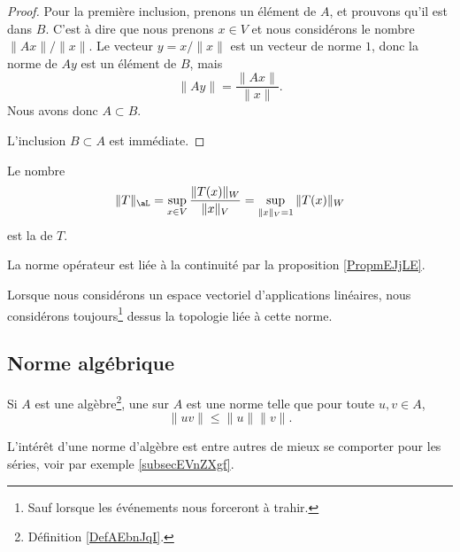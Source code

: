 \begin{proof}
    Pour la première inclusion, prenons un élément de \( A\), et prouvons qu'il est dans \( B\). C'est à dire que nous prenons \( x\in V\) et nous considérons le nombre \( \| Ax \|/\| x \|\). Le vecteur \( y=x/\| x \|\) est un vecteur de norme $1$, donc la norme de \( Ay\) est un élément de \( B\), mais
    \begin{equation}
        \| Ay \|=\frac{ \| Ax \| }{ \| x \| }.
    \end{equation}
    Nous avons donc \( A\subset B\).

    L'inclusion \( B\subset A\) est immédiate.
\end{proof}

\begin{definition}          \label{DefNFYUooBZCPTr}
    Le nombre 
    \begin{equation}
        \| T \|_{\aL}=\sup_{x\in V}\frac{\|T(x)\|_{W}}{\|x\|_{V}} =\sup_{\|x\|_{V}=1}\|T(x)\|_{W}
    \end{equation}
    est la  de $T$. 
\end{definition}

La norme opérateur est liée à la continuité par la proposition \ref{PropmEJjLE}.

Lorsque nous considérons un espace vectoriel d'applications linéaires, nous considérons toujours\footnote{Sauf lorsque les événements nous forceront à trahir.} dessus la topologie liée à cette norme. 

\subsection{Norme algébrique}

\begin{definition}  \label{DefJWRWQue}
    Si \( A\) est une algèbre\footnote{Définition \ref{DefAEbnJqI}.}, une  sur \( A\) est une norme telle que pour toute \( u,v\in A\),
    \begin{equation}
        \| uv \|\leq \| u \|\| v \|.
    \end{equation}
\end{definition}
L'intérêt d'une norme d'algèbre est entre autres de mieux se comporter pour les séries, voir par exemple \ref{subsecEVnZXgf}.

